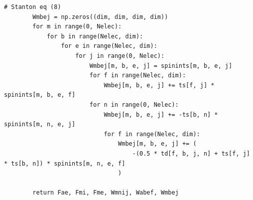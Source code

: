 \begin{lstlisting}[style=MyPython]
        # Stanton eq (8)
        Wmbej = np.zeros((dim, dim, dim, dim))
        for m in range(0, Nelec):
            for b in range(Nelec, dim):
                for e in range(Nelec, dim):
                    for j in range(0, Nelec):
                        Wmbej[m, b, e, j] = spinints[m, b, e, j]
                        for f in range(Nelec, dim):
                            Wmbej[m, b, e, j] += ts[f, j] * spinints[m, b, e, f]
                        for n in range(0, Nelec):
                            Wmbej[m, b, e, j] += -ts[b, n] * spinints[m, n, e, j]
                            for f in range(Nelec, dim):
                                Wmbej[m, b, e, j] += (
                                    -(0.5 * td[f, b, j, n] + ts[f, j] * ts[b, n]) * spinints[m, n, e, f]
                                )

        return Fae, Fmi, Fme, Wmnij, Wabef, Wmbej
\end{lstlisting}

\vspace{5pt}

\noindent

\vspace{5pt}

